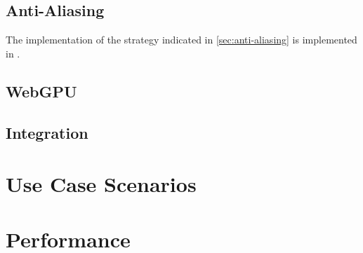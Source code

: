 \subsection{Anti-Aliasing}

The implementation of the strategy indicated in \ref{sec:anti-aliasing} is implemented in .


\subsection{WebGPU}
\subsection{Integration}
\section{Use Case Scenarios}
\section{Performance}